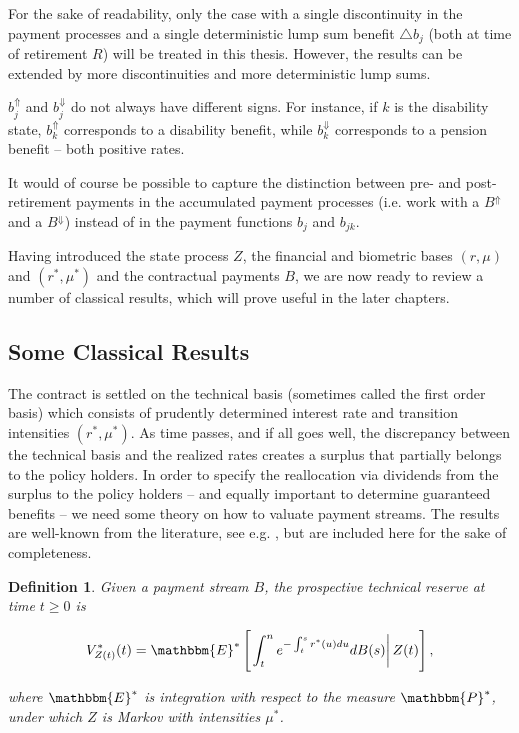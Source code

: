 \documentclass{article}
\newcommand{\1}[1]{\mathbbm{1}_{\left\lbrace #1 \right\rbrace}}
\newcommand{\econdStar}[2][def]{\mathbbm{E}^* \left[ \left. #1 \right| #2 \right]}
\theoremstyle{break}
\newtheorem{definition}{Definition}[section]
\theoremstyle{remark}
\newenvironment{remark}
  {\pushQED{\qed}\renewcommand{\qedsymbol}{\scalebox{1.4}{$\circ$}}\remarkx}
  {\popQED\endremarkx}
\numberwithin{equation}{section}
\begin{document}
\begin{remark}
	For the sake of readability, only the case with a single discontinuity in the payment processes and a single deterministic lump sum benefit $\triangle b_j$ (both at time of retirement $R$) will be treated in this thesis. However, the results can be extended by more discontinuities and more deterministic lump sums.
\end{remark}

\begin{remark}
	$b_j^{\Uparrow}$ and $b_j^{\Downarrow}$ do not always have different signs. For instance, if $k$ is the disability state, $b_k^{\Uparrow}$ corresponds to a disability benefit, while $b_k^{\Downarrow}$ corresponds to a pension benefit -- both positive rates.
\end{remark}

\begin{remark}
	It would of course be possible to capture the distinction between pre- and post-retirement payments in the accumulated payment processes (i.e. work with a $B^{\Uparrow}$ and a $B^{\Downarrow}$) instead of in the payment functions $b_j$ and $b_{jk}$.
\end{remark}

Having introduced the state process $Z$, the financial and biometric bases $(r,\mu)$ and $(r^*,\mu^*)$ and the contractual payments $B$, we are now ready to review a number of classical results, which will prove useful in the later chapters.

\subsection{Some Classical Results}

The contract is settled on the technical basis (sometimes called the first order basis) which consists of prudently determined interest rate and transition intensities $(r^*,\mu^*)$. As time passes, and if all goes well, the discrepancy between the technical basis and the realized rates creates a surplus that partially belongs to the policy holders. In order to specify the reallocation via dividends from the surplus to the policy holders -- and equally important to determine guaranteed benefits -- we need some theory on how to valuate payment streams. The results are well-known from the literature, see e.g. \cite{Norberg1991}, but are included here for the sake of completeness.

\begin{definition}
	Given a payment stream $B$, the prospective technical reserve at time $t \geq 0$ is
	
	\begin{align*}
		V_{Z(t)}^*(t) = \econdStar[\int_t^n e^{-\int_t^s r^*(u)du} dB(s)]{Z(t)},
	\end{align*}
	
	where $\mathbbm{E}^*$ is integration with respect to the measure $\mathbbm{P}^*$, under which $Z$ is Markov with intensities $\mu^*$.
\end{definition}
\end{document}
